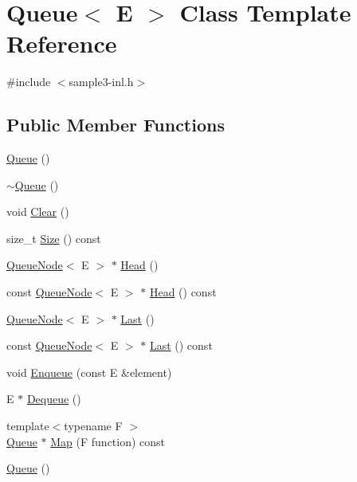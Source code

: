 \hypertarget{class_queue}{}\section{Queue$<$ E $>$ Class Template Reference}
\label{class_queue}


{\ttfamily \#include $<$sample3-\/inl.\+h$>$}

\subsection*{Public Member Functions}
\begin{DoxyCompactItemize}
\item 
\mbox{\hyperlink{class_queue_ab09891e54b51dc677ee6efb350687ae4}{Queue}} ()
\item 
\mbox{\hyperlink{class_queue_a49fe82adb8dc2fb62ab53876a6933d0f}{$\sim$\+Queue}} ()
\item 
void \mbox{\hyperlink{class_queue_acfdd5f9f7e936ca30dcf877370ef9510}{Clear}} ()
\item 
size\+\_\+t \mbox{\hyperlink{class_queue_abc4d78b5f66041011c5590bf703847b0}{Size}} () const
\item 
\mbox{\hyperlink{class_queue_node}{Queue\+Node}}$<$ E $>$ $\ast$ \mbox{\hyperlink{class_queue_a71aa0154ef75bb87a53b6af1829fcd5e}{Head}} ()
\item 
const \mbox{\hyperlink{class_queue_node}{Queue\+Node}}$<$ E $>$ $\ast$ \mbox{\hyperlink{class_queue_a6c906075e0ad2d1f0634990aa106395e}{Head}} () const
\item 
\mbox{\hyperlink{class_queue_node}{Queue\+Node}}$<$ E $>$ $\ast$ \mbox{\hyperlink{class_queue_a430aca3d3b9f5fd588b215028d134b74}{Last}} ()
\item 
const \mbox{\hyperlink{class_queue_node}{Queue\+Node}}$<$ E $>$ $\ast$ \mbox{\hyperlink{class_queue_a7c8c2c64700dfe1df8bf266572cf101a}{Last}} () const
\item 
void \mbox{\hyperlink{class_queue_abaa2e7175457307bca74f5562cbdaaa9}{Enqueue}} (const E \&element)
\item 
E $\ast$ \mbox{\hyperlink{class_queue_a434d465001c3078e999f7a89a8af84c0}{Dequeue}} ()
\item 
{\footnotesize template$<$typename F $>$ }\\\mbox{\hyperlink{class_queue}{Queue}} $\ast$ \mbox{\hyperlink{class_queue_a904a696292fc593adc6fd21fb229d760}{Map}} (F function) const
\item 
\mbox{\hyperlink{class_queue_ab09891e54b51dc677ee6efb350687ae4}{Queue}} ()

\end{DoxyCompactItemize}
